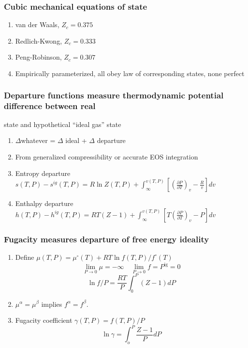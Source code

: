 \documentclass[11pt]{article}
\begin{document}
\subsubsection{Cubic mechanical equations of state}
\label{sec:orga665eea}
\begin{enumerate}
\item van der Waals, \(Z_c = 0.375\)
\item Redlich-Kwong,  \(Z_c = 0.333\)
\item Peng-Robinson, \(Z_c = 0.307\)
\item Empirically parameterized, all obey law of corresponding states, none perfect
\end{enumerate}
\subsubsection{Departure functions measure thermodynamic potential difference between real}
\label{sec:org6b060fc}
state and hypothetical ``ideal gas'' state
\begin{enumerate}
\item \(\Delta\)whatever = \(\Delta\) ideal + \(\Delta\) departure
\item From generalized compressibility or accurate EOS integration
\item Entropy departure \(s(T,P) - s^{ig}(T,P) = R \ln Z(T,P) + \int_\infty^{v(T,P)} \left [ \left ( \frac{\partial P}{\partial T}\right )_v - \frac{R}{v} \right ] dv\)
\item Enthalpy departure \(h(T,P) - h^{ig}(T,P) = RT \left ( Z-1 \right )  + \int_\infty^{v(T,P)} \left [ T \left  ( \frac{\partial P}{\partial T}\right )_v - P \right ] dv\)
\end{enumerate}
\subsubsection{Fugacity measures departure of free energy ideality}
\label{sec:org83324a3}
\begin{enumerate}
\item Define \(\mu(T,P) = \mu^\circ(T) + RT \ln f(T,P)/f^\circ(T)\)
\begin{equation*}
  \lim_{P\rightarrow 0} \mu = -\infty\quad \lim_{P\rightarrow 0} f =P^\text{ig} =0
\end{equation*}
\begin{equation*}
  \ln f/P = \dfrac{RT}{P}\int_0^P(Z-1)dP
\end{equation*}
\item \(\mu^\alpha = \mu^\beta\) implies \(f^\alpha = f^\beta\).
\item Fugacity coefficient \(\gamma(T,P) = f(T,P)/P\)
\begin{equation*}
  \ln\gamma=\int_o^P\dfrac{Z-1}{P}dP
\end{equation*}
\end{enumerate}
\end{document}

